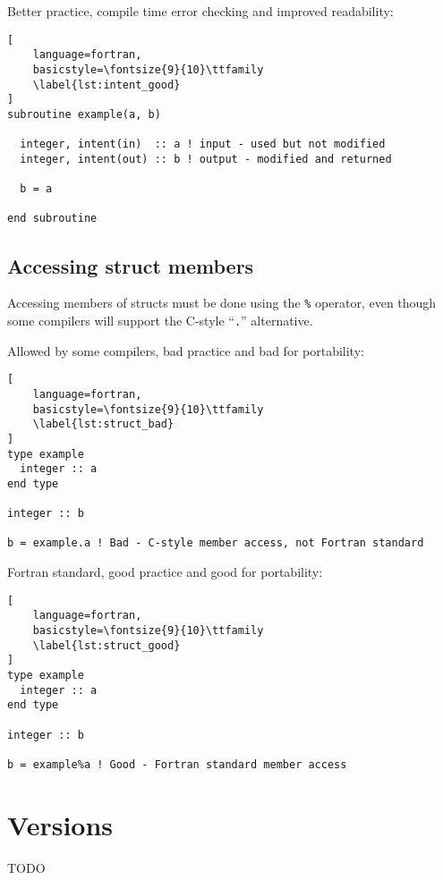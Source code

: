 \documentclass[11pt]{article}
\begin{document}
Better practice, compile time error checking and improved readability:
\begin{lstlisting}[
	language=fortran,
    basicstyle=\fontsize{9}{10}\ttfamily
    \label{lst:intent_good}
]
subroutine example(a, b)

  integer, intent(in)  :: a ! input - used but not modified
  integer, intent(out) :: b ! output - modified and returned

  b = a

end subroutine
\end{lstlisting}

\subsection{Accessing struct members}
Accessing members of structs must be done using the \texttt{\%} operator, even though some compilers will support 
the C-style ``\texttt{.}'' alternative.

Allowed by some compilers, bad practice and bad for portability:
\begin{lstlisting}[
	language=fortran,
    basicstyle=\fontsize{9}{10}\ttfamily
    \label{lst:struct_bad}
]
type example
  integer :: a
end type

integer :: b

b = example.a ! Bad - C-style member access, not Fortran standard
\end{lstlisting}

Fortran standard, good practice and good for portability:
\begin{lstlisting}[
	language=fortran,
    basicstyle=\fontsize{9}{10}\ttfamily
    \label{lst:struct_good}
]
type example
  integer :: a
end type

integer :: b

b = example%a ! Good - Fortran standard member access
\end{lstlisting}

\section{Versions}
TODO
\end{document}
